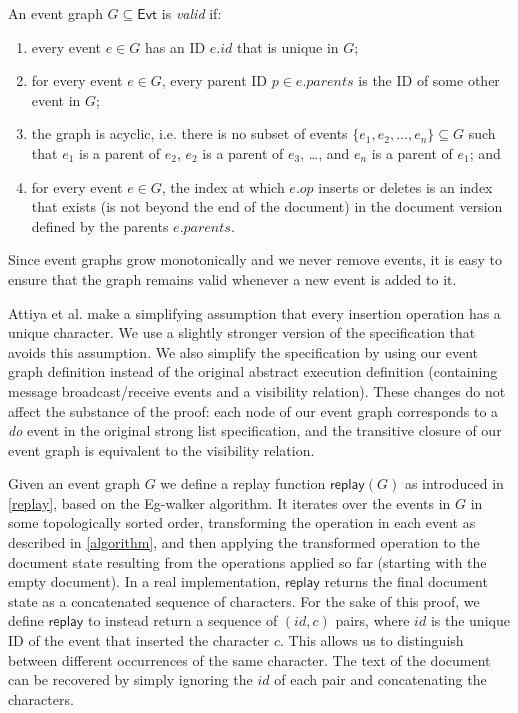 \documentclass[sigplan,10pt]{acmart}
\newcommand{\algname}{Eg-walker\xspace}
\begin{document}
\begin{definition}\label{valid-graph}
  An event graph $G \subseteq \mathsf{Evt}$ is \emph{valid} if:
  \begin{enumerate}
    \item every event $e \in G$ has an ID $e.\mathit{id}$ that is unique in $G$;
    \item for every event $e \in G$, every parent ID $p \in e.\mathit{parents}$ is the ID of some other event in $G$;
    \item the graph is acyclic, i.e. there is no subset of events $\{e_1, e_2, \dots, e_n\} \subseteq G$ such that $e_1$ is a parent of $e_2$, $e_2$ is a parent of $e_3$, \dots, and $e_n$ is a parent of $e_1$; and
    \item for every event $e \in G$, the index at which $e.\mathit{op}$ inserts or deletes is an index that exists (is not beyond the end of the document) in the document version defined by the parents $e.\mathit{parents}$.
  \end{enumerate}
\end{definition}

Since event graphs grow monotonically and we never remove events, it is easy to ensure that the graph remains valid whenever a new event is added to it.

Attiya et al. make a simplifying assumption that every insertion operation has a unique character.
We use a slightly stronger version of the specification that avoids this assumption.
We also simplify the specification by using our event graph definition instead of the original abstract execution definition (containing message broadcast/receive events and a visibility relation).
These changes do not affect the substance of the proof: each node of our event graph corresponds to a \emph{do} event in the original strong list specification, and the transitive closure of our event graph is equivalent to the visibility relation.

Given an event graph $G$ we define a replay function $\mathsf{replay}(G)$ as introduced in \autoref{replay}, based on the \algname algorithm.
It iterates over the events in $G$ in some topologically sorted order, transforming the operation in each event as described in \autoref{algorithm}, and then applying the transformed operation to the document state resulting from the operations applied so far (starting with the empty document).
In a real implementation, $\mathsf{replay}$ returns the final document state as a concatenated sequence of characters.
For the sake of this proof, we define $\mathsf{replay}$ to instead return a sequence of $(\mathit{id}, c)$ pairs, where $\mathit{id}$ is the unique ID of the event that inserted the character $c$.
This allows us to distinguish between different occurrences of the same character.
The text of the document can be recovered by simply ignoring the $\mathit{id}$ of each pair and concatenating the characters.
\end{document}
